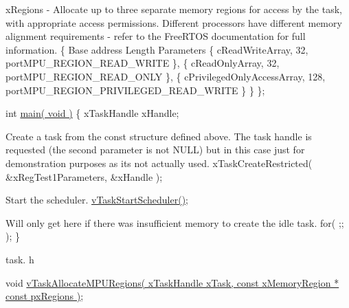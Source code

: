 \begin{DoxyPre}xRegions - Allocate up to three separate memory regions for access by
the task, with appropriate access permissions.  Different processors have
different memory alignment requirements - refer to the FreeRTOS documentation
for full information.
        \{                                                                                       
Base address                                    Length  Parameters
        \{ cReadWriteArray,                              32,             portMPU\_REGION\_READ\_WRITE \},
        \{ cReadOnlyArray,                               32,             portMPU\_REGION\_READ\_ONLY \},
        \{ cPrivilegedOnlyAccessArray,   128,    portMPU\_REGION\_PRIVILEGED\_READ\_WRITE \}
        \}
\};\end{DoxyPre}



\begin{DoxyPre}int \hyperlink{osd_8c_ae66f6b31b5ad750f1fe042a706a4e3d4}{main( void )}
\{
xTaskHandle xHandle;\end{DoxyPre}



\begin{DoxyPre}Create a task from the const structure defined above.  The task handle
is requested (the second parameter is not NULL) but in this case just for
demonstration purposes as its not actually used.
        xTaskCreateRestricted( &xRegTest1Parameters, &xHandle );\end{DoxyPre}



\begin{DoxyPre}Start the scheduler.
        \hyperlink{_common_2_libraries_2_free_r_t_o_s_2_source_2include_2task_8h_aaf9dca1065c60abdeb309d56ab7293cb}{vTaskStartScheduler()};\end{DoxyPre}



\begin{DoxyPre}Will only get here if there was insufficient memory to create the idle
task.
        for( ;; );
\}
   \end{DoxyPre}


task. h 
\begin{DoxyPre}
 void \hyperlink{win32_2win32_2_libraries_2_free_r_t_o_s_2_source_2tasks_8c_a73092c9c9f51467bdaeac07913495579}{vTaskAllocateMPURegions( xTaskHandle xTask, const xMemoryRegion * const pxRegions )};\end{DoxyPre}



